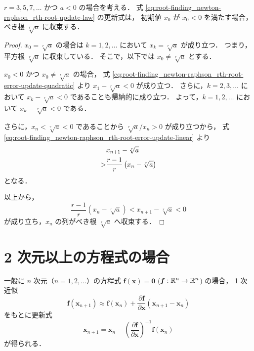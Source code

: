 \begin{theorem}
    $r = 3, 5, 7, \ldots$ かつ $a < 0$ の場合を考える．
    式 \eqref{eq:root-finding_newton-raphson_rth-root-update-law} の更新式は，
    初期値 $x_0$ が $x_0 < 0$ を満たす場合，
    べき根 $\sqrt[r]{a}$ に収束する．
\end{theorem}
\begin{proof}
    $x_0 = \sqrt[r]{a}$ の場合は
    $k = 1, 2, \ldots$ において $x_k = \sqrt[r]{a}$ が成り立つ．
    つまり，平方根 $\sqrt[r]{a}$ に収束している．
    そこで，以下では $x_0 \neq \sqrt[r]{a}$ とする．

    $x_0 < 0$ かつ $x_0 \neq \sqrt[r]{a}$ の場合，
    式 \eqref{eq:root-finding_newton-raphson_rth-root-error-update-quadratic} より
    $x_1 - \sqrt[r]{a} < 0$ が成り立つ．
    さらに，$k = 2, 3, \ldots$ において $x_k - \sqrt[r]{a} < 0$ であることも帰納的に成り立つ．
    よって，$k = 1, 2, \ldots$ において $x_k - \sqrt[r]{a} < 0$ である．

    さらに，$x_n < \sqrt[r]{a} < 0$ であることから
    $\sqrt[r]{a} / x_n > 0$ が成り立つから，
    式 \eqref{eq:root-finding_newton-raphson_rth-root-error-update-linear} より
    \begin{align}
          & x_{n+1} - \sqrt[r]{a}                          \notag \\
        > & \frac{r - 1}{r} \left(x_n - \sqrt[r]{a}\right)
    \end{align}
    となる．

    以上から，
    \begin{equation}
        \frac{r - 1}{r} \left(x_n - \sqrt[r]{a}\right) < x_{n+1} - \sqrt[r]{a} < 0
    \end{equation}
    が成り立ち，$x_n$ の列がべき根 $\sqrt[r]{a}$ へ収束する．
\end{proof}

\section{2 次元以上の方程式の場合}

一般に $n$ 次元（$n=1,2,\ldots$）の方程式
$\bm{f}(\bm{x}) = \bm{0}$ ($\bm{f}: \mathbb{R}^n \to \mathbb{R}^n$) の場合，
1 次近似
\begin{equation}
    \bm{f}(\bm{x}_{n+1}) \approx
    \bm{f}(\bm{x}_n) + \frac{\partial \bm{f}}{\partial \bm{x}} (\bm{x}_{n+1} - \bm{x}_n)
\end{equation}
をもとに更新式
\begin{equation}
    \bm{x}_{n+1} = \bm{x}_n - \left(\frac{\partial \bm{f}}{\partial \bm{x}}\right)^{-1} \bm{f}(\bm{x}_n)
\end{equation}
が得られる．

